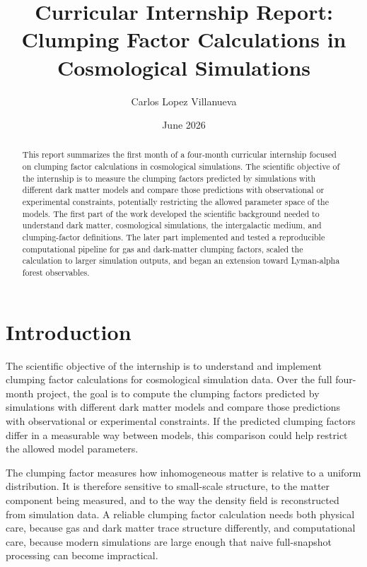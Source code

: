 \documentclass[
    aps,
    prd,
    preprint,
    onecolumn,
    nofootinbib,
    groupedaddress
]{revtex4-2}
\begin{document}
\title{Curricular Internship Report: Clumping Factor Calculations in Cosmological Simulations}
\author{Carlos Lopez Villanueva}
\date{June 2026}

\begin{abstract}
This report summarizes the first month of a four-month curricular internship focused on clumping factor calculations in cosmological simulations. The scientific objective of the internship is to measure the clumping factors predicted by simulations with different dark matter models and compare those predictions with observational or experimental constraints, potentially restricting the allowed parameter space of the models. The first part of the work developed the scientific background needed to understand dark matter, cosmological simulations, the intergalactic medium, and clumping-factor definitions. The later part implemented and tested a reproducible computational pipeline for gas and dark-matter clumping factors, scaled the calculation to larger simulation outputs, and began an extension toward Lyman-alpha forest observables.
\end{abstract}

\maketitle

\section{Introduction}

The scientific objective of the internship is to understand and implement clumping factor calculations for cosmological simulation data. Over the full four-month project, the goal is to compute the clumping factors predicted by simulations with different dark matter models and compare those predictions with observational or experimental constraints. If the predicted clumping factors differ in a measurable way between models, this comparison could help restrict the allowed model parameters.

The clumping factor measures how inhomogeneous matter is relative to a uniform distribution. It is therefore sensitive to small-scale structure, to the matter component being measured, and to the way the density field is reconstructed from simulation data. A reliable clumping factor calculation needs both physical care, because gas and dark matter trace structure differently, and computational care, because modern simulations are large enough that naive full-snapshot processing can become impractical.
\end{document}
